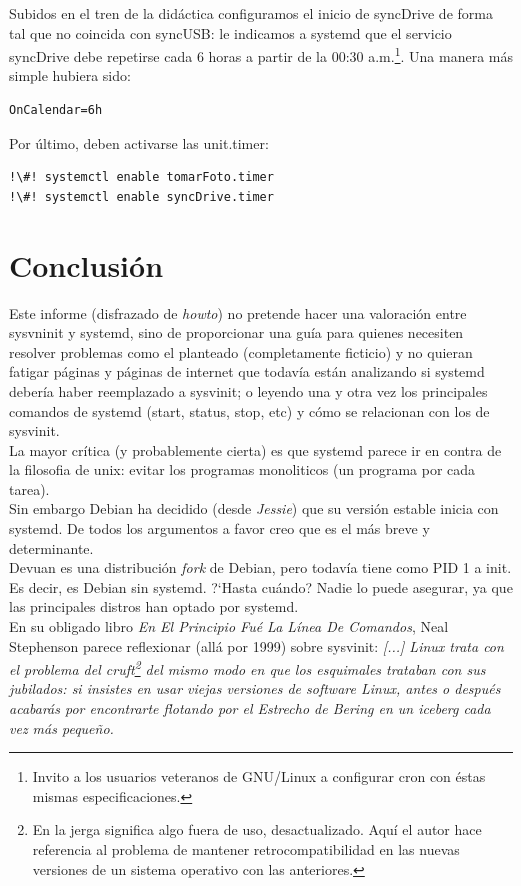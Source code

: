 \documentclass[10pt,a4paper]{article}
\begin{document}
Subidos en el tren de la did\'actica configuramos el inicio de syncDrive de forma tal que no coincida con syncUSB: le indicamos a systemd que el servicio syncDrive debe repetirse cada 6 horas a partir de la 00:30 a.m.\footnote{Invito a los usuarios veteranos de GNU/Linux a configurar cron con \'estas mismas especificaciones.}. Una manera m\'as simple hubiera sido:

\begin{lstlisting}
OnCalendar=6h
\end{lstlisting}

Por \'ultimo, deben activarse las unit.timer:

\begin{lstlisting}
!\#! systemctl enable tomarFoto.timer
!\#! systemctl enable syncDrive.timer
\end{lstlisting}

\section{Conclusi\'on}

Este informe (disfrazado de \emph{howto}) no pretende hacer una valoraci\'on entre sysvninit y systemd, sino de proporcionar una gu\'ia para quienes necesiten resolver problemas como el planteado (completamente ficticio) y no quieran fatigar p\'aginas y p\'aginas de internet que todav\'ia est\'an analizando si systemd deber\'ia haber reemplazado a sysvinit; o leyendo una y otra vez los principales comandos de systemd (start, status, stop, etc) y c\'omo se relacionan con los de sysvinit.\\

La mayor cr\'itica (y probablemente cierta) es que systemd parece ir en contra de la filosofia de unix: evitar los programas monoliticos (un programa por cada tarea).\\

Sin embargo Debian ha decidido (desde \emph{Jessie}) que su versi\'on estable inicia con systemd. De todos los argumentos a favor creo que es el m\'as breve y determinante.\\

Devuan es una distribuci\'on \emph{fork} de Debian, pero todav\'ia tiene como PID 1 a init. Es decir, es Debian sin systemd. ?`Hasta cu\'ando? Nadie lo puede asegurar, ya que las principales distros han optado por systemd.\\

En su obligado libro \emph{En El Principio Fu\'e La L\'inea De Comandos}, Neal Stephenson parece reflexionar (all\'a por 1999) sobre sysvinit: \emph{[...] Linux trata con el problema del cruft\footnote{En la jerga significa algo fuera de uso, desactualizado. Aqu\'i el autor hace referencia al problema de mantener retrocompatibilidad en las nuevas versiones de un sistema operativo con las anteriores.} del mismo modo en que los esquimales trataban con sus jubilados: si insistes en usar viejas versiones de software Linux, antes o después acabarás por encontrarte flotando por el Estrecho de Bering en un iceberg cada vez más pequeño.}
\end{document}
